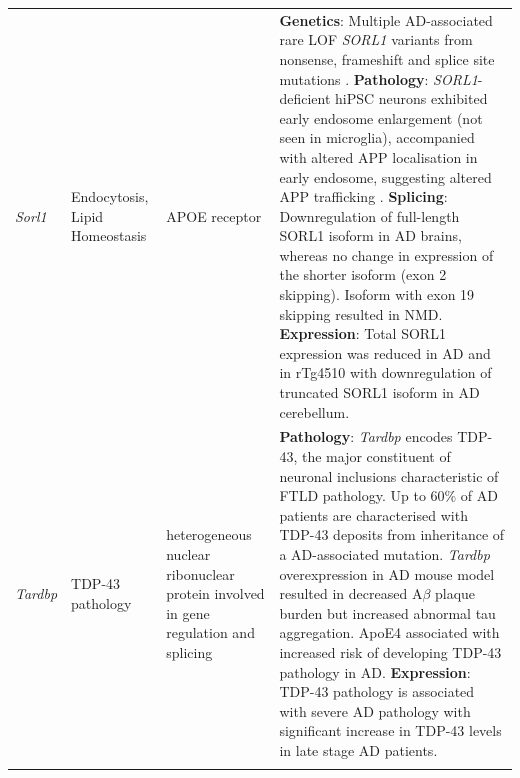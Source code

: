 \begin{landscape}
\begin{longtable}[c]{p{1cm}p{2cm}p{4cm}p{19cm}}
			\centering \textit{Sorl1} &
			\centering Endocytosis, Lipid Homeostasis  &
			\centering APOE receptor &
			\tabitem \textbf{Genetics}: Multiple AD-associated rare LOF \textit{SORL1} variants from nonsense, frameshift and splice site mutations \cite{Fernandez2016}. \newline
			\tabitem \textbf{Pathology}: \textit{SORL1}-deficient hiPSC neurons exhibited early endosome enlargement (not seen in microglia), accompanied with altered APP localisation in early endosome, suggesting altered APP trafficking \cite{Knupp2020}.\newline
			\tabitem \textbf{Splicing}: Downregulation of full-length SORL1 isoform in AD brains, whereas no change in expression of the shorter isoform (exon 2 skipping). Isoform with exon 19 skipping resulted in NMD\cite{Grear2009}. \newline 
			\tabitem \textbf{Expression}: Total SORL1 expression was reduced in AD and in rTg4510\cite{Sobue2021} with downregulation of truncated SORL1 isoform in AD cerebellum. \cite{Monti2021}\\
			\hdashline[0.5pt/5pt]	
			
			\centering \textit{Tardbp} &
			\centering TDP-43 pathology  &
			\centering heterogeneous nuclear ribonuclear protein involved in gene regulation and splicing &			
			\tabitem  \textbf{Pathology}: \textit{Tardbp} encodes TDP-43, the major constituent of neuronal inclusions characteristic of FTLD pathology\cite{Brouwers2010}. \newline 
			\tabitem Up to 60\% of AD patients are characterised with TDP-43 deposits from inheritance of a AD-associated mutation.\cite{Brouwers2010} \newline   
			\tabitem \textit{Tardbp} overexpression in AD mouse model resulted in decreased A$\beta$ plaque burden but increased abnormal tau aggregation.\cite{Davis2017} 
			\tabitem ApoE4 associated with increased risk of developing TDP-43 pathology in AD.  \newline
			\tabitem \textbf{Expression}: TDP-43 pathology is associated with severe AD pathology with significant increase in TDP-43 levels in late stage AD patients.\cite{Herman2011} \\
			\hdashline[0.5pt/5pt]	
						

\end{longtable}
\end{landscape}
